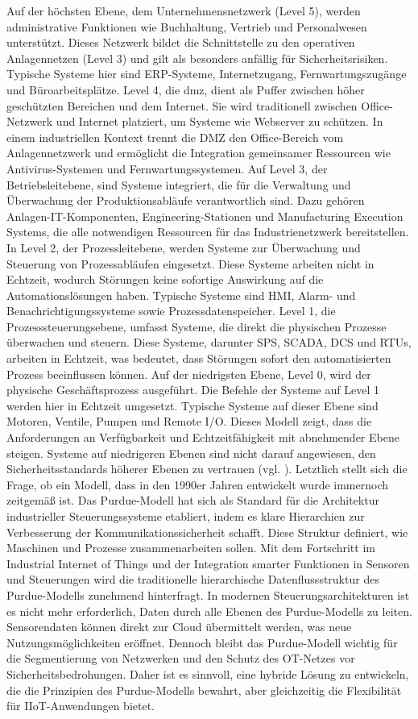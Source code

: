 \noindent Auf der höchsten Ebene, dem Unternehmensnetzwerk (Level 5), werden administrative Funktionen wie Buchhaltung, Vertrieb und Personalwesen unterstützt. Dieses Netzwerk bildet die Schnittstelle zu den operativen Anlagennetzen (Level 3) und gilt als besonders anfällig für Sicherheitsrisiken. Typische Systeme hier sind ERP-Systeme, Internetzugang, Fernwartungszugänge und Büroarbeitsplätze. Level 4, die \ac{dmz}, dient als Puffer zwischen höher geschützten Bereichen und dem Internet. Sie wird traditionell zwischen Office-Netzwerk und Internet platziert, um Systeme wie Webserver zu schützen. In einem industriellen Kontext trennt die DMZ den Office-Bereich vom Anlagennetzwerk und ermöglicht die Integration gemeinsamer Ressourcen wie Antivirus-Systemen und Fernwartungssystemen. Auf Level 3, der Betriebsleitebene, sind Systeme integriert, die für die Verwaltung und Überwachung der Produktionsabläufe verantwortlich sind. Dazu gehören Anlagen-IT-Komponenten, Engineering-Stationen und Manufacturing Execution Systems, die alle notwendigen Ressourcen für das Industrienetzwerk bereitstellen. In Level 2, der Prozessleitebene, werden Systeme zur Überwachung und Steuerung von Prozessabläufen eingesetzt. Diese Systeme arbeiten nicht in Echtzeit, wodurch Störungen keine sofortige Auswirkung auf die Automationslösungen haben. \clearpage \noindent Typische Systeme sind HMI, Alarm- und Benachrichtigungssysteme sowie Prozessdatenspeicher. Level 1, die Prozesssteuerungsebene, umfasst Systeme, die direkt die physischen Prozesse überwachen und steuern. Diese Systeme, darunter SPS, SCADA, DCS und RTUs, arbeiten in Echtzeit, was bedeutet, dass Störungen sofort den automatisierten Prozess beeinflussen können. Auf der niedrigsten Ebene, Level 0, wird der physische Geschäftsprozess ausgeführt. Die Befehle der Systeme auf Level 1 werden hier in Echtzeit umgesetzt. Typische Systeme auf dieser Ebene sind Motoren, Ventile, Pumpen und Remote I/O. Dieses Modell zeigt, dass die Anforderungen an Verfügbarkeit und Echtzeitfähigkeit mit abnehmender Ebene steigen. Systeme auf niedrigeren Ebenen sind nicht darauf angewiesen, den Sicherheitsstandards höherer Ebenen zu vertrauen (vgl. \cite{sichereIndustrie2}). Letztlich stellt sich die Frage, ob ein Modell, dass in den 1990er Jahren entwickelt wurde immernoch zeitgemäß ist. Das Purdue-Modell hat sich als Standard für die Architektur industrieller Steuerungssysteme etabliert, indem es klare Hierarchien zur Verbesserung der Kommunikationssicherheit schafft. Diese Struktur definiert, wie Maschinen und Prozesse zusammenarbeiten sollen. Mit dem Fortschritt im Industrial Internet of Things und der Integration smarter Funktionen in Sensoren und Steuerungen wird die traditionelle hierarchische Datenflussstruktur des Purdue-Modells zunehmend hinterfragt. In modernen Steuerungsarchitekturen ist es nicht mehr erforderlich, Daten durch alle Ebenen des Purdue-Modells zu leiten. Sensorendaten können direkt zur Cloud übermittelt werden, was neue Nutzungsmöglichkeiten eröffnet. Dennoch bleibt das Purdue-Modell wichtig für die Segmentierung von Netzwerken und den Schutz des OT-Netzes vor Sicherheitsbedrohungen. Daher ist es sinnvoll, eine hybride Lösung zu entwickeln, die die Prinzipien des Purdue-Modells bewahrt, aber gleichzeitig die Flexibilität für IIoT-Anwendungen bietet. 